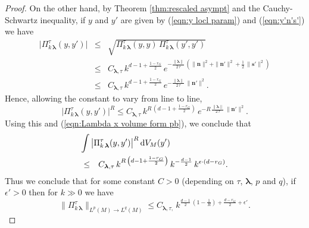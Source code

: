 \documentclass[12pt,a4paper]{article}
\theoremstyle{plain}
\theoremstyle{definition}
\begin{document}
\begin{proof}
On the other hand, by Theorem \ref{thm:rescaled asympt}
and the Cauchy-Schwartz inequality, 
if $y$ and $y'$ are given by (\ref{eqn:y locl param})
and (\ref{eqn:y'n's'}) 
we have 
\begin{eqnarray}
\label{eqn:bound on szego}
\big|\Pi^\tau_{k\,\boldsymbol{\lambda}}(y,y')\big|
&\le& \sqrt{\Pi^\tau_{k\,\boldsymbol{\lambda}}(y,y)\,
\Pi^\tau_{k\,\boldsymbol{\lambda}}(y',y')}\\
&\le& C_{\boldsymbol{\lambda},\tau}\,k^{d-1+\frac{1-r_G}{2}}\,
e^{-\frac{\|\boldsymbol{\lambda}\|}{2\,\tau}\,
\left(\|\mathbf{n}\|^2+\|\mathbf{n}'\|^2+\frac{1}{2}\,
\|\mathbf{s}'\|^2  \right)}\nonumber\\
&\le& 
C_{\boldsymbol{\lambda},\tau}\,k^{d-1+\frac{1-r_G}{2}}\,
e^{-\frac{\|\boldsymbol{\lambda}\|}{2\,\tau}\,
\|\mathbf{n}'\|^2}.
\nonumber
\end{eqnarray}
Hence, allowing the constant to vary from line to line,
\begin{equation}
\label{eqn:Pitau R bd}
\big|\Pi^\tau_{k\,\boldsymbol{\lambda}}(y,y')\big|^R\le 
C_{\boldsymbol{\lambda},\tau}\,
k^{R\,\left(d-1+\frac{1-r_G}{2}\right)}\,
e^{-R\,\frac{\|\boldsymbol{\lambda}\|}{2\,\tau}\,
\|\mathbf{n}'\|^2}.
\end{equation}
%
Using this and (\ref{eqn:Lambda x volume form pb}),
we conclude that
\begin{eqnarray}
\label{eqn:bound on integral Pitau}
\lefteqn{   
\int\big|\Pi^\tau_{k\,\boldsymbol{\lambda}}(y,y')\big|^R\,
\mathrm{d}V_M(y')}\\
&\le &
C_{\boldsymbol{\lambda},\tau}\,
k^{R\,\left(d-1+\frac{1-r_G}{2}\right)}\,
k^{-\frac{d-1}{2}}
\,k^{\epsilon\cdot (d-r_G)}.\nonumber
\end{eqnarray}
Thus we conclude that for some constant $C>0$ (depending
on $\tau$, $\boldsymbol{\lambda}$, $p$ and $q$), if 
$\epsilon'>0$ then for $k\gg 0$
we have
$$
\|\Pi^{\tau}_{k\,\boldsymbol{\lambda}}\|_{L^p(M)\rightarrow L^q(M)}\le C_{\boldsymbol{\lambda},\tau,}\,
k^{\frac{d-1}{2}\,\left( 1-\frac{1}{R}  \right)
+\frac{d-r_G}{2}+\epsilon'}.
$$





\end{proof}
\end{document}
